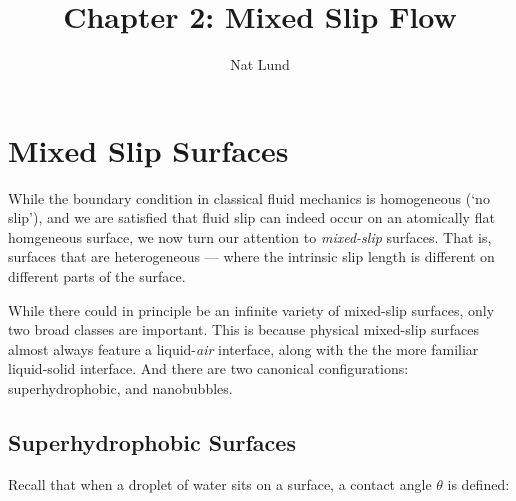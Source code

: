 \documentclass[a4paper]{report}
\title{Chapter 2: Mixed Slip Flow}
\author{Nat Lund}
\begin{document}
\maketitle

\section{Mixed Slip Surfaces}

While the boundary condition in classical fluid mechanics is homogeneous (`no slip'), and we are satisfied that fluid slip can indeed occur on an atomically flat homgeneous surface, we now turn our attention to \emph{mixed-slip} surfaces.
That is, surfaces that are heterogeneous --- where the intrinsic slip length is different on different parts of the surface.

While there could in principle be an infinite variety of mixed-slip surfaces, only two broad classes are important.  This is because physical mixed-slip surfaces almost always feature a liquid-\emph{air} interface, along with the the more familiar liquid-solid interface.  And there are two canonical configurations: superhydrophobic, and nanobubbles.

\subsection{Superhydrophobic Surfaces}

Recall that when a droplet of water sits on a surface, a contact angle $\theta$ is defined:

\begin{center}
\end{center}
\end{document}
